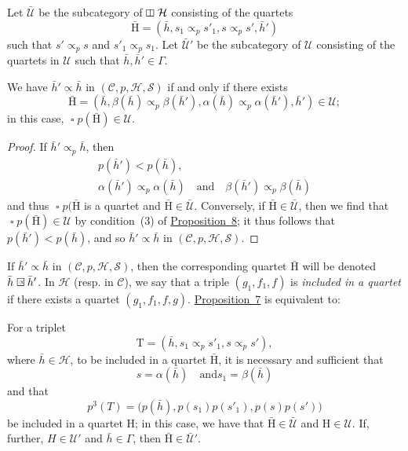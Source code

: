 \documentclass[a4paper,fleqn]{article}
\theoremstyle{plain}
\newenvironment{proposition}[1]
  {\renewcommand\theinnerproposition{#1}\innerproposition}
  {\endinnerproposition}
\theoremstyle{definition}
\newcommand{\oldpage}[1]{{\marginpar{\footnotesize$\bigg\vert$\,\,\,\,\textit{p.~#1}}}}
\newcommand{\textand}{\quad\text{and}\quad}
\newcommand{\CC}{\mathcal{C}}
\newcommand{\HH}{\mathcal{H}}
\newcommand{\rHH}{\mathrm{H}}
\renewcommand{\SS}{\mathcal{S}}
\newcommand{\UU}{\mathcal{U}}
\newcommand{\subs}{\mathrel{\propto}}
\DeclareMathOperator{\sq}{\square}
\DeclareMathOperator{\vsq}{\raisebox{-.1em}{\rotatebox{90}{$\boxminus$}\,}}
\newcommand{\sqsubs}{\mathrel{\mathrlap{\square}\raisebox{.17em}{\scaleobj{0.65}{\,\,\propto}}}}
\begin{document}
\oldpage{366}
Let $\bar{\UU}$ be the subcategory of $\vsq\HH$ consisting of the quartets
\[
  \bar{\rHH}
  = (\bar{h}, s_1\subs_p s'_1, s\subs_p s', \bar{h}')
\]
such that $s'\subs_p s$ and $s'_1\subs_p s_1$.
Let $\bar{\UU}'$ be the subcategory of $\UU$ consisting of the quartets in $\UU$ such that $\bar{h},\bar{h}'\in\Gamma$.

\begin{proposition}{9}
\label{proposition:i-9}
  We have $\bar{h}'\subs\bar{h}$ in $(\CC,p,\HH,\SS)$ if and only if there exists
  \[
    \bar{\rHH}
    = \left(
      \bar{h},
      \beta(\bar{h})\subs_p\beta(\bar{h}'),
      \alpha(\bar{h})\subs_p\alpha(\bar{h}'),
      \bar{h}'
    \right) \in \UU;
  \]
  in this case, $\sq p(\bar{\rHH})\in\UU$.
\end{proposition}

\begin{proof}
  If $\bar{h}'\subs_p\bar{h}$, then
  \[
    \begin{gathered}
      p(\bar{h}')<p(\bar{h}),
    \\\alpha(\bar{h}')\subs_p\alpha(\bar{h})
      \textand
      \beta(\bar{h}')\subs_p\beta(\bar{h})
    \end{gathered}
  \]
  and thus $\sq p(\bar{\rHH}$ is a quartet and $\bar{\rHH}\in\bar{\UU}$.
  Conversely, if $\bar{\rHH}\in\bar{\UU}$, then we find that $\sq p(\bar{\rHH})\in\UU$ by condition~(3) of \hyperref[proposition:i-8]{Proposition~8};
  it thus follows that $p(\bar{h}')<p(\bar{h})$, and so $\bar{h}'\subs\bar{h}$ in $(\CC,p,\HH,\SS)$.
\end{proof}

If $\bar{h}'\subs\bar{h}$ in $(\CC,p,\HH,\SS)$, then the corresponding quartet $\bar{\rHH}$ will be denoted $\bar{h}\sqsubs\bar{h}'$.
In $\HH$ (resp. in $\CC$), we say that a triple $(g_1,f_1,f)$  is \emph{included in a quartet} if there exists a quartet $(g_1,f_1,f,g)$.
\hyperref[proposition:i-7]{Proposition~7} is equivalent to:

\begin{proposition}{7~\emph{bis}}
\label{proposition:i-7bis}
  For a triplet
  \[
    \mathrm{T}
    = (\bar{h},s_1\subs_p s'_1, s\subs_p s'),
  \]
  where $\bar{h}\in\HH$, to be included in a quartet $\bar{\rHH}$, it is necessary and sufficient that
  \[
    s=\alpha(\bar{h})
    \quad\text{and}
    s_1=\beta(\bar{h})
  \]
  and that
  \[
    p^3(T)
    = \big(
      p(\bar{h}), p(s_1)p(s'_1), p(s)p(s')
    \big)
  \]
  be included in a quartet $\rHH$;
  in this case, we have that $\bar{\rHH}\in\bar{\UU}$ and $\rHH\in\UU$.
  If, further, $H\in\UU'$ and $\bar{h}\in\Gamma$, then $\bar{\rHH}\in\bar{\UU}'$.
\end{proposition}
\end{document}
